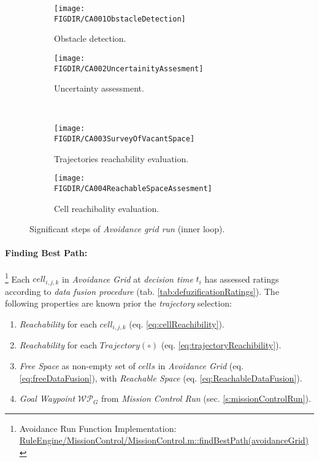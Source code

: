 \begin{figure}[H]
\centering
    \begin{subfigure}{0.48\textwidth}
        \texttt{[image: \\FIGDIR/CA001ObstacleDetection]}
        \caption{Obstacle detection.}
        \label{fig:obstacleDetectionAvoidanceGrid}
    \end{subfigure}
    \begin{subfigure}{0.48\textwidth}
        \texttt{[image: \\FIGDIR/CA002UncertainityAssesment]} 
        \caption{Uncertainty assessment.}
        \label{fig:uncertainityAssesmentAvoidanceGrid}
    \end{subfigure}
    \\
    \begin{subfigure}{0.48\textwidth}
        \texttt{[image: \\FIGDIR/CA003SurveyOfVacantSpace]} 
        \caption{Trajectories reachability evaluation.}
        \label{fig:trajectoriesSafetyEvaluationAvoidanceGrid}
    \end{subfigure}
    \begin{subfigure}{0.48\textwidth}
        \texttt{[image: \\FIGDIR/CA004ReachableSpaceAssesment]} 
        \caption{Cell reachibality evaluation.}
        \label{fig:reachibilityAssessmentAvoidanceGrid}
    \end{subfigure}
    \caption{Significant steps of \emph{Avoidance grid run} (inner loop).}
    \label{fig:significantStepsofAvoidanceGridRun}
\end{figure}



\paragraph{Finding Best Path:} \footnote{Avoidance Run Function Implementation: \url{RuleEngine/MissionControl/MissionControl.m::findBestPath(avoidanceGrid)}} Each $cell_{i,j,k}$ in \emph{Avoidance Grid} at \emph{decision time} $t_i$ has assessed ratings according to \emph{data fusion procedure} (tab. \ref{tab:defuzificationRatings}). The following properties are known prior the \emph{trajectory} selection:

\begin{enumerate}
    \item \emph{Reachability} for each  $cell_{i,j,k}$ (eq. \ref{eq:cellReachibility}).

    \item \emph{Reachability} for each  $Trajectory(\circ)$ (eq. \ref{eq:trajectoryReachibility}).

    \item \emph{Free Space} as non-empty set of $cells$ in \emph{Avoidance Grid} (eq. \ref{eq:freeDataFusion}), with \emph{Reachable Space} (eq. \ref{eq:ReachableDataFusion}).

    \item \emph{Goal Waypoint} $\mathscr{WP}_G$ from \emph{Mission Control Run} (sec. \ref{s:missionControlRun}).
\end{enumerate}

